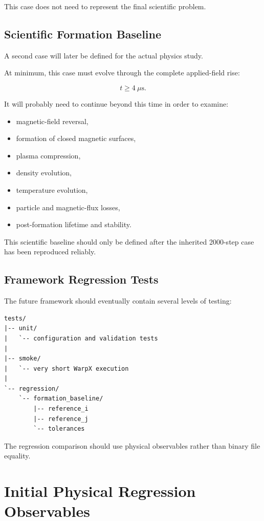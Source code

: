 \documentclass[11pt,a4paper]{article}
\begin{document}
This case does not need to represent the final scientific problem.

\subsection{Scientific Formation Baseline}

A second case will later be defined for the actual physics study.

At minimum, this case must evolve through the complete applied-field rise:

\[
t \geq 4~\mu\mathrm{s}.
\]

It will probably need to continue beyond this time in order to examine:

\begin{itemize}
    \item magnetic-field reversal,
    \item formation of closed magnetic surfaces,
    \item plasma compression,
    \item density evolution,
    \item temperature evolution,
    \item particle and magnetic-flux losses,
    \item post-formation lifetime and stability.
\end{itemize}

This scientific baseline should only be defined after the inherited 2000-step case has been reproduced reliably.

\subsection{Framework Regression Tests}

The future framework should eventually contain several levels of testing:

\begin{lstlisting}
tests/
|-- unit/
|   `-- configuration and validation tests
|
|-- smoke/
|   `-- very short WarpX execution
|
`-- regression/
    `-- formation_baseline/
        |-- reference_i
        |-- reference_j
        `-- tolerances
\end{lstlisting}

The regression comparison should use physical observables rather than binary file equality.

\section{Initial Physical Regression Observables}
\end{document}
